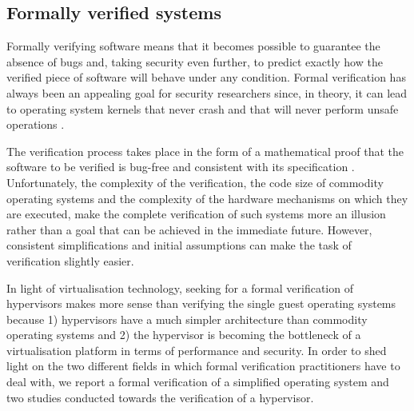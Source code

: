 
\subsection{Formally verified systems} \label{formal}
Formally verifying software means that it becomes possible to guarantee the absence of bugs and, taking security even further, to predict exactly how the verified piece of software will behave under any condition. Formal verification has always been an appealing goal for security researchers since, in theory, it can lead to operating system kernels that never crash and that will never perform unsafe operations \cite{Elphinstone}.  

The verification process takes place in the form of a mathematical proof that the software to be verified is bug-free and consistent with its specification \cite{formalpractice}.
Unfortunately, the complexity of the verification, the code size of commodity operating systems and the complexity of the hardware mechanisms on which they are executed, make the complete verification of such systems more an illusion rather than a goal that can be achieved in the immediate future. 
However, consistent simplifications and initial assumptions can make the task of verification slightly easier. 

In light of virtualisation technology, seeking for a formal verification of hypervisors makes more sense than verifying the single guest operating systems because 1) hypervisors have a much simpler architecture than commodity operating systems and 2) the hypervisor is becoming the bottleneck of a virtualisation platform in terms of performance and security. 
In order to shed light on the two different fields in which formal verification practitioners have to deal with, we report a formal verification of a simplified operating system and two studies conducted towards the verification of a hypervisor.

